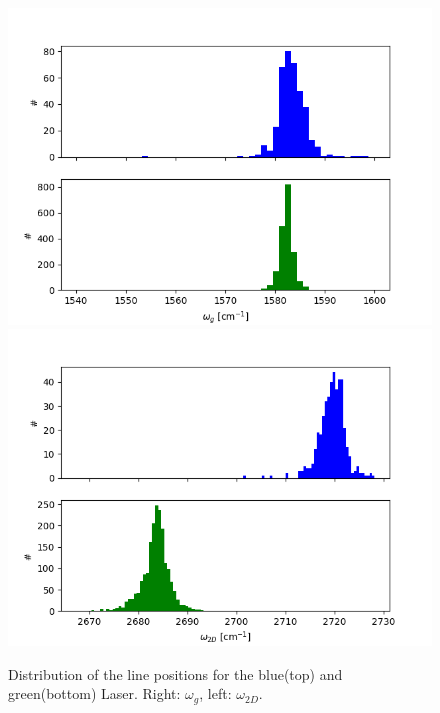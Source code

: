 \documentclass[12pt,a4paper]{article}
\begin{document}
\begin{figure}[h]
\centering
\includegraphics[scale=0.5]{Bilder/Laser/omegag_hist.png}
\includegraphics[scale=0.5]{Bilder/Laser/omega2d_hist.png}
\caption{Distribution of the line positions for the blue(top) and green(bottom) Laser. Right: $\omega_{g}$, left: $\omega_{2D}$.}
\label{fig:Laser_omega_hist}
\end{figure}
\end{document}
